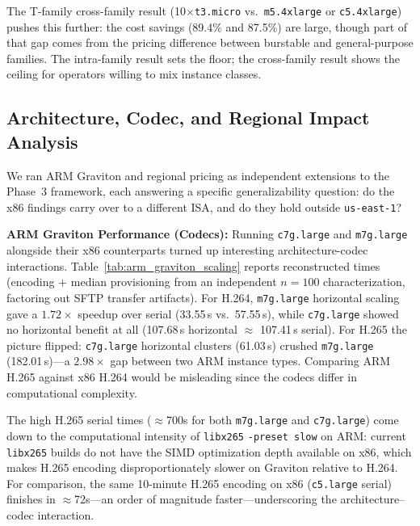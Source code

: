 \documentclass[conference]{IEEEtran}
\begin{document}
The T-family cross-family result (10$\times$\texttt{t3.micro} vs.\ \texttt{m5.4xlarge} or \texttt{c5.4xlarge}) pushes this further: the cost savings (89.4\% and 87.5\%) are large, though part of that gap comes from the pricing difference between burstable and general-purpose families. The intra-family result sets the floor; the cross-family result shows the ceiling for operators willing to mix instance classes.

\subsection{Architecture, Codec, and Regional Impact Analysis}

We ran ARM Graviton and regional pricing as independent extensions to the Phase~3 framework, each answering a specific generalizability question: do the x86 findings carry over to a different ISA, and do they hold outside \texttt{us-east-1}?

\textbf{ARM Graviton Performance (Codecs):} Running \texttt{c7g.large} and \texttt{m7g.large} alongside their x86 counterparts turned up interesting architecture-codec interactions. Table~\ref{tab:arm_graviton_scaling} reports reconstructed times (encoding $+$ median provisioning from an independent $n=100$ characterization, factoring out SFTP transfer artifacts). For H.264, \texttt{m7g.large} horizontal scaling gave a $1.72\times$ speedup over serial (33.55\,s vs.\ 57.55\,s), while \texttt{c7g.large} showed no horizontal benefit at all (107.68\,s horizontal $\approx$ 107.41\,s serial). For H.265 the picture flipped: \texttt{c7g.large} horizontal clusters (61.03\,s) crushed \texttt{m7g.large} (182.01\,s)---a $2.98\times$ gap between two ARM instance types. Comparing ARM H.265 against x86 H.264 would be misleading since the codecs differ in computational complexity.

The high H.265 serial times ($\approx$700s for both \texttt{m7g.large} and \texttt{c7g.large}) come down to the computational intensity of \texttt{libx265} \texttt{-preset slow} on ARM: current \texttt{libx265} builds do not have the SIMD optimization depth available on x86, which makes H.265 encoding disproportionately slower on Graviton relative to H.264. For comparison, the same 10-minute H.265 encoding on x86 (\texttt{c5.large} serial) finishes in $\approx$72s---an order of magnitude faster---underscoring the architecture--codec interaction.
\end{document}
